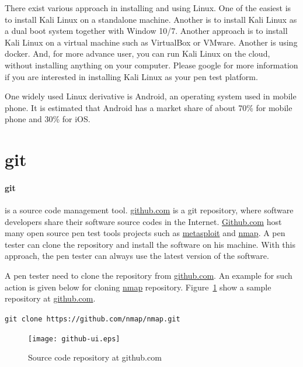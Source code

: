 \documentclass[7x9]{times}
\begin{document}
There exist various approach in installing and using Linux. One of the easiest is to install
Kali Linux on a standalone machine. Another is to install Kali Linux as a dual boot system 
together with Window 10/7. Another approach is to install Kali Linux on a virtual machine such
as VirtualBox or VMware. Another is using docker. And, for more advance user, you can run Kali 
Linux on the cloud, without installing anything on your computer. Please google for more information
if you are interested in installing Kali Linux as your pen test platform.



One widely used Linux derivative is Android, an operating system used in 
mobile phone. It is estimated that Android has a market share of about 70\% 
for mobile phone and 30\% for iOS.



\section{git}

\paragraph{git}\cite{loeliger2012} is a source code
management tool. \url{github.com} is a git repository, where
software developers share their software source codes in the
Internet. \url{Github.com} host many open source pen test
tools projects such as \url{metasploit} and \url{nmap}. A
pen tester can clone the repository and install the software
on his machine. With this approach, the pen tester can
always use the latest version of the software.

A pen tester need to clone the repository from \url{github.com}. An
example for such action is given below for cloning \url{nmap}
repository. Figure~\ref{fig:github} show a sample repository at
\url{github.com}.


\verb|git clone https://github.com/nmap/nmap.git|



\begin{figure}
\centering
\texttt{[image: github-ui.eps]}
\caption{Source code repository at github.com}
\label{fig:github}
\end{figure}
\end{document}
